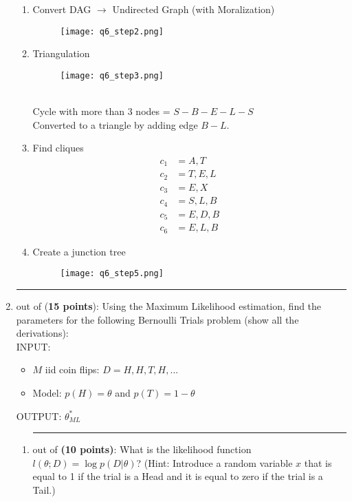 \documentclass{article}%
\begin{document}
\begin{enumerate}
\begin{enumerate}
\item Convert DAG $\rightarrow$ Undirected Graph (with Moralization) \\
\begin{figure}[h]
\centering
\texttt{[image: q6\_step2.png]}
\end{figure}

\item Triangulation \\
\begin{figure}[h]
\centering
\texttt{[image: q6\_step3.png]}
\end{figure} \\
Cycle with more than $3$ nodes = $S-B-E-L-S$ \\
Converted to a triangle by adding edge $B-L$. 

\item Find cliques
\begin{align*}
c_1 &= A,T \\
c_2 &= T,E,L \\
c_3 &= E,X \\
c_4 &= S,L,B \\
c_5 &= E,D,B \\
c_6 &= E,L,B
\end{align*}

\item Create a junction tree \\
\begin{figure}[h]
\centering
\texttt{[image: q6\_step5.png]}
\end{figure}
\end{enumerate}

\newpage

\item \rule{0.5 in}{1 pt} out of (\textbf{15 points}): Using the Maximum Likelihood estimation, find the parameters for the following Bernoulli Trials problem (show all the derivations):\\
INPUT: 
\begin{itemize}
	\item $M$ iid coin flips: $D={H, H, T, H,...}$
	\item Model: $p(H) = \theta$ and $p(T)=1-\theta$
\end{itemize}
OUTPUT: $\theta _{ML}^* $
\begin{enumerate}
		\item \rule{0.5 in}{1 pt} out of \textbf{(10 points)}: What is the likelihood function $l(\theta; D)=\log p(D|\theta)$? (Hint: Introduce a random variable $x$ that is equal to 1 if the trial is a Head and it is equal to zero if the trial is a Tail.) 
		


\end{enumerate}
\end{enumerate}
\end{document}
